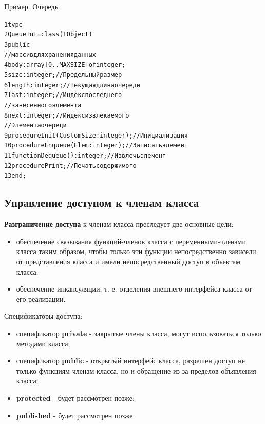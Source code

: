 \documentclass{beamer}
\begin{document}
\begin{frame}[fragile]{Пример. Очередь}
\begin{alltt}
1 type
2   QueueInt = class(TObject) 
3     public
        //массив для хранения данных
4       body: array[0..MAXSIZE] of integer; 
5       size: integer;   //Предельный размер 
6       length: integer; //Текущая длина очереди
7       last: integer;   //Индекс последнего 
                         //занесенного элемента
8       next: integer;   //Индекс извлекаемого 
                         //Элемента очереди                      
9       procedure Init(CustomSize: integer); //Инициализация   
10      procedure Enqueue(Elem: integer); //Записать элемент
11      function Dequeue(): integer; //Извлечь элемент
12      procedure Print; //Печать содержимого
13 end;
\end{alltt}
\end{frame}

\subsection{Управление доступом к членам класса}
\begin{frame}
\textbf{Разграничение доступа} к членам класса преследует две основные цели:
\begin{itemize}
\item обеспечение связывания функций-членов класса с переменными-членами
класса таким образом, чтобы только эти функции непосредственно зависели от представления класса и имели непосредственный доступ к объектам класса;
\item обеспечение инкапсуляции, т. е. отделения внешнего интерфейса класса от его реализации.
\end{itemize}

Спецификаторы доступа:
\begin{itemize}
\item спецификатор \textbf{private} - закрытые члены класса, могут использоваться только методами класса;
\item спецификатор \textbf{public} - открытый интерфейс класса, разрешен доступ не только функциям-членам класса, но и обращение из-за пределов объявления класса;
\item \textbf{protected} - будет рассмотрен позже;
\item \textbf{published} - будет рассмотрен позже.
\end{itemize}
\end{frame}
\end{document}
